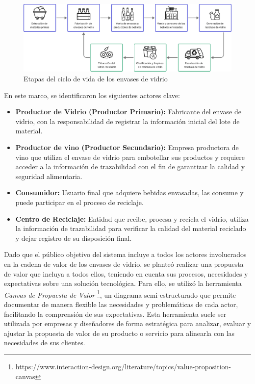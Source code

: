 \begin{figure}[!htb]
    \centering
    \includegraphics[width=\linewidth]{Figures/glass-lifecycle.png}
    \caption{Etapas del ciclo de vida de los envases de vidrio}
    \label{fig:glass-lifecycle-modelling}
\end{figure}

En este marco, se identificaron los siguientes actores clave:

\begin{itemize}
    \item \textbf{Productor de Vidrio (Productor Primario):} Fabricante del envase de vidrio, con la responsabilidad de registrar la información inicial del lote de material.
    \item \textbf{Productor de vino (Productor Secundario):} Empresa productora de vino que utiliza el envase de vidrio para embotellar sus productos y requiere acceder a la información de trazabilidad con el fin de garantizar la calidad y seguridad alimentaria.
    \item \textbf{Consumidor:} Usuario final que adquiere bebidas envasadas, las consume y puede participar en el proceso de reciclaje.
    \item \textbf{Centro de Reciclaje:} Entidad que recibe, procesa y recicla el vidrio, utiliza la información de trazabilidad para verificar la calidad del material reciclado y dejar registro de su disposición final.
\end{itemize}

Dado que el público objetivo del sistema incluye a todos los actores involucrados en la cadena de valor de los envases de vidrio, se planteó realizar una propuesta de valor que incluya a todos ellos, teniendo en cuenta sus procesos, necesidades y expectativas sobre una solución tecnológica. Para ello, se utilizó la herramienta \textit{Canvas de Propuesta de Valor} \footnote{https://www.interaction-design.org/literature/topics/value-proposition-canvas}, un diagrama semi-estructurado que permite documentar de manera flexible las necesidades y problemáticas de cada actor, facilitando la comprensión de sus expectativas. Esta herramienta suele ser utilizada por empresas y diseñadores de forma estratégica para analizar, evaluar y ajustar la propuesta de valor de su producto o servicio para alinearla con las necesidades de sus clientes.


